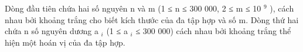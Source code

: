 Dòng đầu tiên chứa hai số nguyên n và m (1 ≤ n ≤ 300 000, 2 ≤ m ≤ 10   $^    9   $   ), cách nhau bởi khoảng trắng cho biết kích thước của đa tập hợp và số m. Dòng thứ hai chứa n số nguyên dương a   $_    i   $   (1 ≤ a   $_    i   $   ≤ 300 000) cách nhau bởi khoảng trắng thể hiện một hoán vị của đa tập hợp.